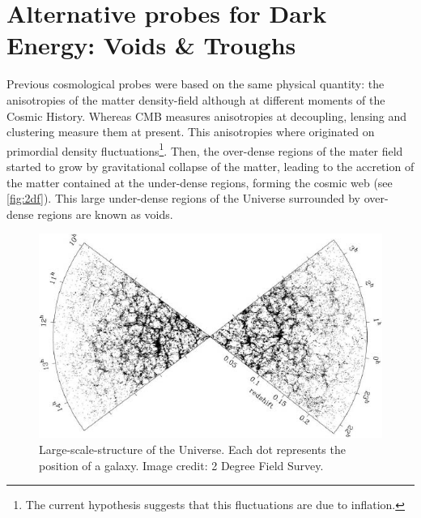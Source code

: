 \section{Alternative probes for Dark Energy: Voids \& Troughs}
Previous cosmological probes were based on the same physical quantity: the anisotropies of the matter density-field although at different moments of the Cosmic History. Whereas CMB measures anisotropies at decoupling, lensing and clustering measure them at present. This anisotropies where originated on primordial density fluctuations\footnote{The current hypothesis suggests that this fluctuations are due to inflation.}. Then, the over-dense regions of the mater field started to grow by gravitational collapse of the matter, leading to the accretion of the matter contained at the under-dense regions, forming the cosmic  web (see \autoref{fig:2df}). This large under-dense regions of the Universe surrounded by over-dense regions are known as voids.
\begin{figure}
\includegraphics[width=\textwidth]{./Pictures/2df.jpg}
\caption{Large-scale-structure of the Universe. Each dot represents the position of a galaxy. Image credit: 2 Degree Field Survey.}
\label{fig:2df}
\end{figure}
\newline


